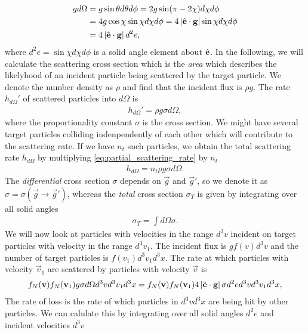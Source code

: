 \begin{align}
	g d\Omega &= g\sin\theta d\theta d\phi = 2g\sin(\pi - 2\chi)d\chi d\phi\\
	&= 4g\cos\chi\sin\chi d\chi d\phi = 4\left|\hat {\mathbf{e}}\cdot\mathbf g\right|\sin\chi d\chi d\phi\\
	&= 4\left|\hat {\mathbf{e}}\cdot\mathbf g\right|d^2e,
\end{align}
where $d^2e = \sin\chi d\chi d\phi$ is a solid angle element about $\hat {\mathbf{e}}$. In the following, we will calculate the scattering cross section which is the \textit{area} which describes the likelyhood of an incident particle being scattered by the target particle. We denote the number density as $\rho$ and find that the incident flux is $\rho g$. The rate $h_{d\Omega}'$ of scattered particles into $d\Omega$ is
\begin{align}
	\label{eq:partial_scattering_rate}
	h_{d\Omega}' = \rho g\sigma d\Omega,
\end{align}
where the proportionality constant $\sigma$ is the cross section. We might have several target particles colliding indenpendently of each other which will contribute to the scattering rate. If we have $n_t$ such particles, we obtain the total scattering rate $h_{d\Omega}$ by multiplying \eqref{eq:partial_scattering_rate} by $n_t$
\begin{align}
	h_{d\Omega} = n_t\rho g\sigma d\Omega.
\end{align}
The \textit{differential} cross section $\sigma$ depends on $\vec g$ and $\vec g'$, so we denote it as $\sigma = \sigma(\vec g\rightarrow \vec g')$, whereas the \textit{total} cross section $\sigma_T$ is given by integrating over all solid angles
\begin{align}
	\sigma_T = \int d\Omega \sigma.
\end{align}
We will now look at particles with velocities in the range $d^3 v$ incident on target particles with velocity in the range $d^3 v_1$. The incident flux is $gf(v)d^3v$ and the number of target particles is $f(v_1)d^3v_1d^3x$. The rate at which particles with velocity $\vec v_1$ are scattered by particles with velocity $\vec v$ is 
\begin{align}
	f_N(\mathbf v)f_N(\mathbf v_1) g \sigma d\Omega d^3v d^3v_1 d^3 x = f_N(\mathbf v)f_N(\mathbf v_1)4\left|\hat {\mathbf{e}}\cdot \mathbf g\right| \sigma d^2e d^3v d^3v_1 d^3 x,
\end{align}
The rate of loss is the rate of which particles in $d^3vd^3x$ are being hit by other particles. We can calulate this by integrating over all solid angles $d^2 e$ and incident velocities $d^3 v$
